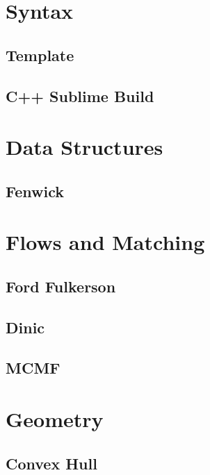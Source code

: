 \section{Syntax}
\subsection{Template}
\raggedbottom
\hrulefill
\subsection{C++ Sublime Build}
\raggedbottom
\hrulefill

\section{Data Structures}
\subsection{Fenwick}
\raggedbottom
\hrulefill

\section{Flows and Matching}
\subsection{Ford Fulkerson}
\raggedbottom
\hrulefill
\subsection{Dinic}
\raggedbottom
\hrulefill
\subsection{MCMF}
\raggedbottom
\hrulefill

\section{Geometry}
\subsection{Convex Hull}
\raggedbottom
\hrulefill
